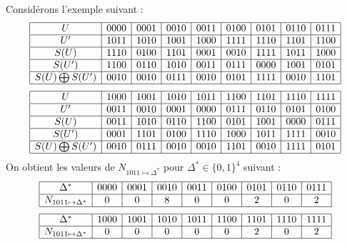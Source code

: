 \documentclass[a4paper, 10pt]{thesis}
\begin{document}
\begin{ex}
    Considérons l'exemple suivant :
    \begin{displaymath}
        \begin{array}{|c|c|c|c|c|c|c|c|c|}\hline
            U & 0000 & 0001 & 0010 & 0011 & 0100 & 0101 & 0110 & 0111 \\ \hline
            U' & 1011 & 1010 & 1001 & 1000 & 1111 & 1110 & 1101 & 1100 \\ \hline
            S(U) & 1110 & 0100 & 1101 & 0001 & 0010 & 1111 & 1011 & 1000\\ \hline
            S(U') & 1100 & 0110 & 1010 & 0011 & 0111 & 0000 & 1001 & 0101\\ \hline
            S(U) \bigoplus S(U') & 0010 & 0010 & 0111 & 0010 & 0101 & 1111 & 0010 & 1101\\ \hline
        \end{array}
    \end{displaymath}
    \begin{displaymath}
        \begin{array}{|c|c|c|c|c|c|c|c|c|}\hline
            U & 1000 & 1001 & 1010 & 1011 & 1100 & 1101 & 1110 & 1111 \\ \hline
            U' & 0011 & 0010 & 0001 & 0000 & 0111 & 0110 & 0101 & 0100 \\ \hline
            S(U) & 0011 & 1010 & 0110 & 1100 & 0101 & 1001 & 0000& 0111 \\ \hline
            S(U') & 0001 & 1101 & 0100 & 1110 & 1000 & 1011 & 1111 & 0010 \\ \hline
            S(U) \bigoplus S(U') & 0010 & 0111 & 0010 & 0010 & 1101 & 0010 & 1111 & 0101 \\ \hline
        \end{array}
    \end{displaymath}
    On obtient les valeurs de $N_{1011 \mapsto \Delta^*}$ pour $\Delta^* \in \{0, 1\}^4$ suivant :
    \begin{displaymath}
        \begin{array}{|c|c|c|c|c|c|c|c|c|}\hline
            \Delta^* & 0000 & 0001 & 0010 & 0011 & 0100 & 0101 & 0110 & 0111 \\ \hline
            N_{1011 \mapsto \Delta^*} & 0 & 0 & 8 & 0 & 0 & 2 & 0 & 2 \\ \hline
        \end{array}
    \end{displaymath}
    \begin{displaymath}
        \begin{array}{|c|c|c|c|c|c|c|c|c|}\hline
            \Delta^* & 1000 & 1001 & 1010 & 1011 & 1100 & 1101 & 1110 & 1111 \\ \hline
            N_{1011 \mapsto \Delta^*} & 0 & 0 & 0 & 0 & 0 & 2 & 0 & 2 \\ \hline
        \end{array}
    \end{displaymath}
\end{ex}
\end{document}
